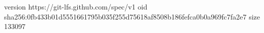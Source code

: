 version https://git-lfs.github.com/spec/v1
oid sha256:0fb433b01d5551661795b035f255d75618af8508b186fefca0b0a969fc7fa2e7
size 133097
